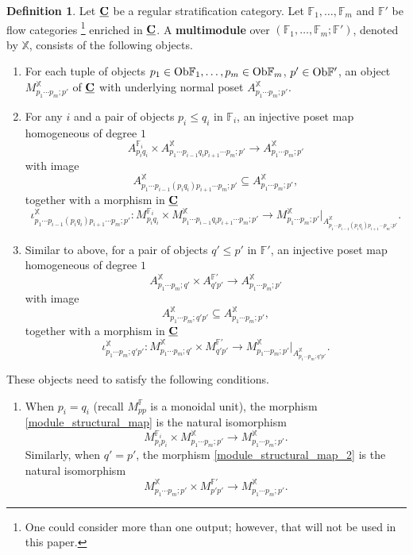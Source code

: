 \documentclass[reqno, 10pt]{amsart}
\numberwithin{equation}{section}
\numberwithin{equation}{section}
\renewcommand{\subset}{\subseteq}
\theoremstyle{definition}
\newtheorem{defn}[thm]{Definition}
\theoremstyle{remark}
\newcommand{\beq}{\begin{equation}}
\newcommand{\eeq}{\end{equation}}
\newcommand{\beqn}{\begin{equation*}}
\newcommand{\eeqn}{\end{equation*}}
\newcommand{\mb}{\mathbb}
\newcommand{\uds}[1]{\underline{\smash{#1}}}
\begin{document}
\begin{defn}\label{defn_multimodule}
Let $\uds{\bf C}$ be a regular stratification category. Let ${\mb F}_1, \ldots, {\mb F}_m$ and ${\mb F}'$ be flow categories \footnote{One could consider more than one output; however, that will not be used in this paper.} enriched in $\uds{\bf C}$. A {\bf multimodule} over $({\mb F}_1, \ldots, {\mb F}_m; {\mb F}')$, denoted by ${\mb X}$, consists of the following objects.
\begin{enumerate}

\item For each tuple of objects $p_1\in {\rm Ob}{\mb F}_1, \ldots, p_m \in {\rm Ob}{\mb F}_m$, $p' \in {\rm Ob} {\mb F}'$, an object $M_{p_1 \cdots p_m; p'}^{\mb X}$ of $\uds{\bf C}$ with underlying normal poset $A_{p_1 \cdots p_m; p'}^{\mb X}$.

\item For any $i$ and a pair of objects $p_i \leq q_i$ in ${\mb F}_i$, an injective poset map homogeneous of degree $1$
\beqn
A^{{\mb F}_i}_{p_i q_i} \times A_{p_1 \cdots p_{i-1} q_i p_{i+1} \cdots p_m; p'}^{\mb X} \to A_{p_1 \cdots p_m; p'}^{\mb X}
\eeqn
with image
\beqn
A_{p_1 \cdots p_{i-1}(p_i q_i)p_{i+1} \cdots p_m; p'}^{\mb X} \subset A_{p_1 \cdots p_m; p'}^{\mb X},
\eeqn
together with a morphism in $\uds{\bf C}$
\beq\label{module_structural_map}
\iota_{p_1 \cdots p_{i-1}(p_i q_i) p_{i+1} \cdots p_m; p'}^{\mb X}: M_{p_i q_i}^{{\mb F}_i} \times M_{p_1 \cdots p_{i-1} q_i p_{i+1} \cdots p_m; p'}^{\mb X} \to M_{p_1 \cdots p_m; p'}^{\mb X}|_{A_{p_1 \cdots p_{i-1}(p_i q_i)p_{i+1} \cdots p_m; p'}^{\mb X}}.
\eeq

\item Similar to above, for a pair of objects $q' \leq  p'$ in ${\mb F}'$, an injective poset map homogeneous of degree $1$
\beqn
A_{p_1 \cdots p_m; q'}^{\mb X}\times A_{q'p'}^{{\mb F}'} \to A_{p_1 \cdots p_m; p'}^{\mb X}
\eeqn
with image
\beqn
A_{p_1 \cdots p_m; q'p'}^{\mb X} \subset A_{p_1 \cdots p_m; p'}^{\mb X},
\eeqn
together with a morphism in $\uds{\bf C}$
\beq\label{module_structural_map_2}
\iota_{p_1 \cdots p_m; q'p'}^{\mb X}: M_{p_1 \cdots p_m; q'}^{\mb X}\times M_{q'p'}^{{\mb F}'} \to M_{p_1 \cdots p_m; p'}^{\mb X} |_{A_{p_1 \cdots p_m; q'p'}^{\mb X}}.
\eeq
\end{enumerate}
These objects need to satisfy the following conditions.
\begin{enumerate}

\item When $p_i = q_i$ (recall $M_{pp}^{\mb F}$ is a monoidal unit), the morphism \eqref{module_structural_map} is the natural isomorphism
\beqn
M_{p_i p_i}^{{\mb F}_i} \times M_{p_1 \cdots p_m; p'}^{\mb X} \to M_{p_1 \cdots p_m; p'}^{\mb X}.
\eeqn
Similarly, when $q' = p'$, the morphism \eqref{module_structural_map_2} is the natural isomorphism
\beqn
M_{p_1 \cdots p_m; p'}^{\mb X} \times M_{p'p'}^{{\mb F}'} \to M_{p_1 \cdots p_m; p'}^{\mb X}.
\eeqn



\end{enumerate}
\end{defn}
\end{document}
